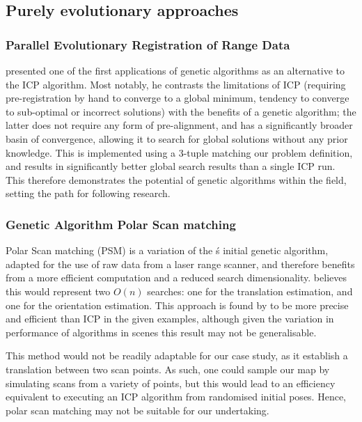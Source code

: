 \documentclass[authoryearcitations]{UoYCSproject}
\begin{document}
\subsection{Purely evolutionary approaches}
\subsubsection{Parallel Evolutionary Registration of Range Data}
\citet{Robertson2002-ou} presented one of the first applications of genetic algorithms as an alternative to the ICP algorithm. Most notably, he contrasts the limitations of ICP (requiring pre-registration by hand to converge to a global minimum, tendency to converge to sub-optimal or incorrect solutions) with the benefits of a genetic algorithm; the latter does not require any form of pre-alignment, and has a significantly broader basin of convergence, allowing it to search for global solutions without any prior knowledge. This is implemented using a 3-tuple matching our problem definition, and results in significantly better global search results than a single ICP run. This therefore demonstrates the potential of genetic algorithms within the field, setting the path for following research.

\subsubsection{Genetic Algorithm Polar Scan matching}
Polar Scan matching (PSM) is a variation of the \citeauthor{Robertson2002-ou}\'s initial genetic algorithm, adapted for the use of raw data from a laser range scanner, and therefore benefits from a more efficient computation and a reduced search dimensionality. \citet{Ze-Su2007-li} believes this would represent two $O(n)$ searches: one for the translation estimation, and one for the orientation estimation. This approach is found by \citeauthor{Ze-Su2007-li} to be more precise and efficient than ICP in the given examples, although given the variation in performance of algorithms in scenes \cite{Donoso2017-wp} this result may not be generalisable. 

This method would not be readily adaptable for our case study, as it establish a translation between two scan points. As such, one could sample our map by simulating scans from a variety of points, but this would lead to an efficiency equivalent to executing an ICP algorithm from randomised initial poses. Hence, polar scan matching may not be suitable for our undertaking.
\end{document}
